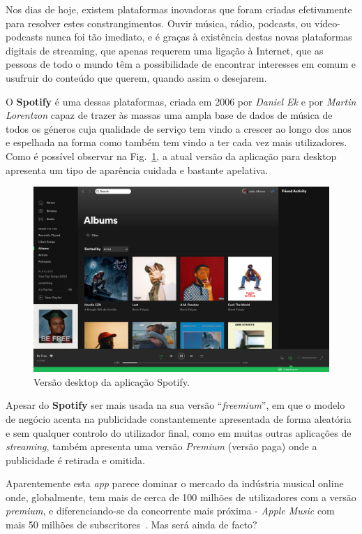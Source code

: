 \documentclass{report}
\begin{document}
Nos dias de hoje, existem plataformas inovadoras que foram criadas efetivamente para resolver estes constrangimentos. Ouvir música, rádio, podcasts, ou vídeo-podcasts nunca foi tão imediato, e é graças à existência destas novas plataformas digitais de streaming, que apenas requerem uma ligação à Internet, que as pessoas de todo o mundo têm a possibilidade de encontrar interesses em comum e usufruir do conteúdo que querem, quando assim o desejarem. 

O \textbf{Spotify} é uma dessas plataformas, criada em 2006 por \textit{Daniel Ek} e por \textit{Martin Lorentzon} capaz de trazer às massas uma ampla base de dados de música de todos os géneros cuja qualidade de serviço tem vindo a crescer ao longo dos anos e espelhada na forma como também tem vindo a ter cada vez mais utilizadores. Como é possível observar na Fig.~\ref{Fig:DesktopSpotify}, a atual versão da aplicação para desktop apresenta um tipo de aparência cuidada e bastante apelativa.

\begin{figure}
    \centering
    \includegraphics[width=\textwidth]{Imagens/DesktopSpotify}
    \caption{Versão desktop da aplicação Spotify.}
    \label{Fig:DesktopSpotify}
\end{figure}

Apesar do \textbf{Spotify} ser mais usada na sua versão ``\textit{freemium}'', em que o modelo de negócio acenta na publicidade constantemente apresentada de forma aleatória e sem qualquer controlo do utilizador final, como em muitas outras aplicações de \textit{streaming}, também apresenta  uma versão \textit{Premium} (versão paga) onde a publicidade é retirada e omitida.

Aparentemente esta \textit{app} parece dominar o mercado da indústria musical online onde, globalmente, tem mais de cerca de 100 milhões de utilizadores com a versão \textit{premium}, e diferenciando-se da concorrente mais próxima - \textit{Apple Music} com mais 50 milhões de subscritores~\cite{NuscaEtAll:2019}. Mas será ainda de facto?
\end{document}
